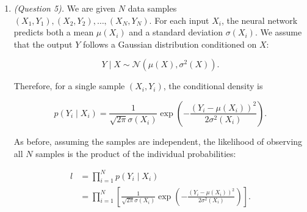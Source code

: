 \documentclass[12pt]{article}
\begin{document}
\begin{enumerate}
To verify that this gives a maximum when $\bar{x}>0$, rewrite the derivative as

\[
\begin{aligned}
\frac{dL}{d\lambda}
&= \frac{\sum_{t=1}^N x_t-N\lambda}{\lambda} \\
&= \frac{N(\bar{x}-\lambda)}{\lambda}.
\end{aligned}
\]

For $\lambda>0$, the factor $N/\lambda$ is positive, so the sign of the derivative is determined by $\bar{x}-\lambda$. Thus the derivative is positive for $0<\lambda<\bar{x}$, zero at $\lambda=\bar{x}$, and negative for $\lambda>\bar{x}$. The log likelihood therefore increases up to $\bar{x}$ and decreases afterward. Since the logarithm is strictly increasing, this also maximizes the likelihood.

Therefore, on the parameter space $\lambda>0$, the maximum likelihood estimate is

\[
\begin{aligned}
\hat{\lambda}
&= \operatorname*{arg\,max}_{\lambda>0} l(\lambda\mid x) \\
&= \operatorname*{arg\,max}_{\lambda>0} L(\lambda\mid x) \\
&= \boxed{\frac{1}{N}\sum_{t=1}^N x_t=\bar{x}}.
\end{aligned}
\] 

\item \emph{(Question 5).} We are given $N$ data samples $(X_1,Y_1), (X_2,Y_2), \ldots, (X_N,Y_N)$.
For each input $X_i$, the neural network predicts both a mean $\mu(X_i)$ and a
standard deviation $\sigma(X_i)$. We assume that the output $Y$ follows a
Gaussian distribution conditioned on $X$:

\[
Y \mid X \sim \mathcal{N}\left(\mu(X),\sigma^2(X)\right).
\]

Therefore, for a single sample $(X_i,Y_i)$, the conditional density is

\[
p(Y_i \mid X_i)
=
\frac{1}{\sqrt{2\pi}\sigma(X_i)}
\exp\left(
-\frac{(Y_i-\mu(X_i))^2}{2\sigma^2(X_i)}
\right).
\]

As before, assuming the samples are independent, the likelihood of observing
all $N$ samples is the product of the individual probabilities:

\[
\begin{aligned}
l
&= \prod_{i=1}^N p(Y_i \mid X_i) \\
&= \prod_{i=1}^N
\left[
\frac{1}{\sqrt{2\pi}\sigma(X_i)}
\exp\left(
-\frac{(Y_i-\mu(X_i))^2}{2\sigma^2(X_i)}
\right)
\right].
\end{aligned}
\]


\end{enumerate}
\end{document}
